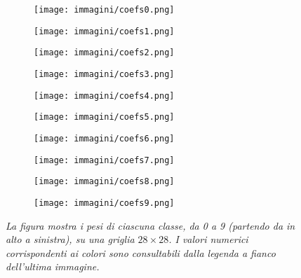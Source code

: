 \documentclass{article}
\begin{document}
\begin{figure}[H]
    \centering
    \begin{subfigure}[b]{0.25\textwidth}
        \centering
        \texttt{[image: immagini/coefs0.png]}
    \end{subfigure}
    \begin{subfigure}[b]{0.25\textwidth}
        \centering
        \texttt{[image: immagini/coefs1.png]}
    \end{subfigure}
    \begin{subfigure}[b]{0.25\textwidth}
        \centering
        \texttt{[image: immagini/coefs2.png]}
    \end{subfigure}
    \begin{subfigure}[b]{0.25\textwidth}
        \centering
        \texttt{[image: immagini/coefs3.png]}
    \end{subfigure}
    \begin{subfigure}[b]{0.25\textwidth}
        \centering
        \texttt{[image: immagini/coefs4.png]}
    \end{subfigure}
    \begin{subfigure}[b]{0.25\textwidth}
        \centering
        \texttt{[image: immagini/coefs5.png]}
    \end{subfigure}
    \begin{subfigure}[b]{0.25\textwidth}
        \centering
        \texttt{[image: immagini/coefs6.png]}
    \end{subfigure}
    \begin{subfigure}[b]{0.25\textwidth}
        \centering
        \texttt{[image: immagini/coefs7.png]}
    \end{subfigure}
    \begin{subfigure}[b]{0.25\textwidth}
        \centering
        \texttt{[image: immagini/coefs8.png]}
    \end{subfigure}
    \begin{subfigure}[b]{0.25\textwidth}
        \centering
        \texttt{[image: immagini/coefs9.png]}
    \end{subfigure}
    \caption{\emph{La figura mostra i pesi di ciascuna classe, da 0 a 9 (partendo da in alto a sinistra), su una griglia $28 \times 28$. I valori numerici corrispondenti ai colori sono consultabili dalla legenda a fianco dell'ultima immagine.}}
    \label{fig:pesi}
\end{figure}
\end{document}
